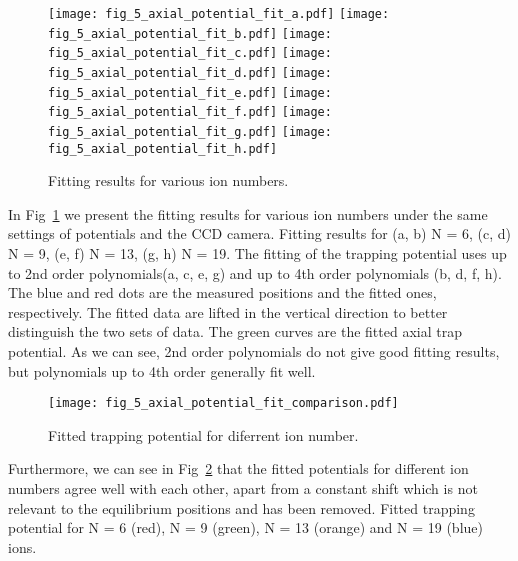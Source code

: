 \begin{figure}
    \centering
    \subcaptionbox{\label{fig:axial_potential_fit_a}}
    {\texttt{[image: fig\_5\_axial\_potential\_fit\_a.pdf]}}
    \subcaptionbox{\label{fig:axial_potential_fit_b}}
    {\texttt{[image: fig\_5\_axial\_potential\_fit\_b.pdf]}}
    \subcaptionbox{\label{fig:axial_potential_fit_c}}
    {\texttt{[image: fig\_5\_axial\_potential\_fit\_c.pdf]}}
    \subcaptionbox{\label{fig:axial_potential_fit_d}}
    {\texttt{[image: fig\_5\_axial\_potential\_fit\_d.pdf]}}
    \subcaptionbox{\label{fig:axial_potential_fit_e}}
    {\texttt{[image: fig\_5\_axial\_potential\_fit\_e.pdf]}}
    \subcaptionbox{\label{fig:axial_potential_fit_f}}
    {\texttt{[image: fig\_5\_axial\_potential\_fit\_f.pdf]}}
    \subcaptionbox{\label{fig:axial_potential_fit_g}}
    {\texttt{[image: fig\_5\_axial\_potential\_fit\_g.pdf]}}
    \subcaptionbox{\label{fig:axial_potential_fit_h}}
    {\texttt{[image: fig\_5\_axial\_potential\_fit\_h.pdf]}}
    \caption{Fitting results for various ion numbers.}
    \label{fig:axial_potential_fit}
\end{figure}

In Fig~\ref{fig:axial_potential_fit} we present the fitting results for various ion numbers under the same settings of potentials and the CCD camera. Fitting results for (a, b) N = 6, (c, d) N = 9, (e, f) N = 13, (g, h) N = 19. The fitting of the trapping potential uses up to 2nd order polynomials(a, c, e, g) and up to 4th order polynomials (b, d, f, h). The blue and red dots are the measured positions and the fitted ones, respectively. The fitted data are lifted in the vertical direction to better distinguish the two sets of data. The green curves are the fitted axial trap potential. As we can see, 2nd order polynomials do not give good fitting results, but polynomials up to 4th order generally fit well.

\begin{figure}
    \centering
    \texttt{[image: fig\_5\_axial\_potential\_fit\_comparison.pdf]}
    \caption{Fitted trapping potential for diferrent ion number.}
    \label{fig:axial_potential_fit_comparison}
\end{figure}

Furthermore, we can see in Fig~\ref{fig:axial_potential_fit_comparison} that the fitted potentials for different ion numbers agree well with each other, apart from a constant shift which is not relevant to the equilibrium positions and has been removed. Fitted trapping potential for N = 6 (red), N = 9 (green), N = 13 (orange) and N = 19 (blue) ions.

